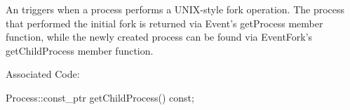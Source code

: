
An  triggers when a process performs a UNIX-style fork
operation. The process that performed the initial fork is returned via Event's
getProcess member function, while the newly created process can be found via
EventFork's getChildProcess member function.

Associated  Code: 

\begin{apient}
Process::const_ptr getChildProcess() const;
\end{apient}

